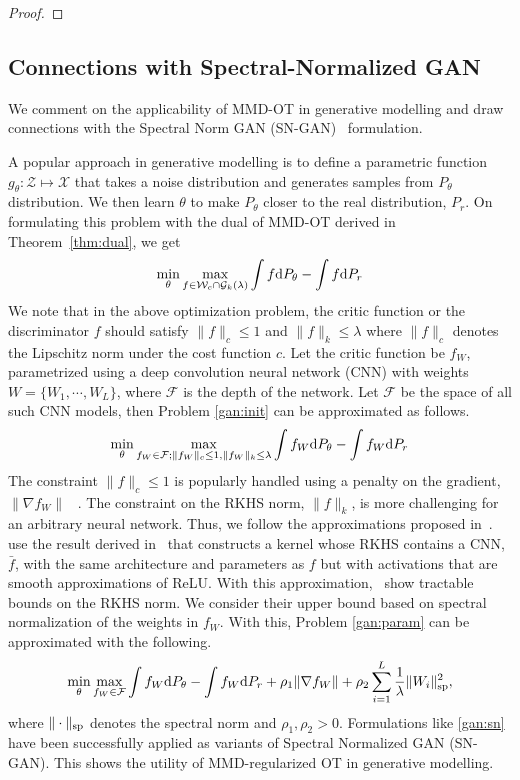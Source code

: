\begin{proof}
\end{proof}
\subsection{Connections with Spectral-Normalized GAN}\label{sgan}
We comment on the applicability of MMD-OT in generative modelling and draw connections with the Spectral Norm GAN (SN-GAN)~\citep{sngan} formulation.

A popular approach in generative modelling is to define a parametric function $g_\theta:\mathcal{Z} \mapsto \mathcal{X}$ that takes a noise distribution and generates samples from $P_\theta$ distribution. We then learn $\theta$ to make $P_\theta$ closer to the real distribution, $P_r$. On formulating this problem with the dual of MMD-OT derived in Theorem~\ref{thm:dual}, we get
\begin{equation}\label{gan:init}
    \min\limits_\theta \max\limits_{f\in \mathcal{W}_c\cap\mathcal{G}_k(\lambda)} \int f \textup{d}P_\theta - \int f \textup{d}P_r
\end{equation}
We note that in the above optimization problem, the critic function or the discriminator $f$ should satisfy $\|f\|_c\leq 1$ and $\|f\|_k\leq \lambda$ where $\|f\|_c$ denotes the Lipschitz norm under the cost function $c$. Let the critic function be $f_W$, parametrized using a deep convolution neural network (CNN) with weights $W=\{W_1, \cdots, W_L\}$, where $\mathcal{F}$ is the depth of the network. Let $\mathcal{F}$ be the space of all such CNN models, then Problem \ref{gan:init} can be approximated as follows.
\begin{equation}\label{gan:param}
    \min\limits_\theta \max\limits_{
    f_W\in \mathcal{F};
    \|f_W\|_c\leq 1, \|f_W\|_k\leq \lambda} \int f_W \textup{d}P_\theta - \int f_W \textup{d}P_r
\end{equation}
The constraint $\|f\|_c\leq 1$ is popularly handled using a penalty on the gradient, $\|\nabla f_W\|$ ~\citep{wgan-gp}. The constraint on the RKHS norm, $\|f\|_k$, is more challenging for an arbitrary neural network. Thus, we follow the approximations proposed in~\cite{Bietti19}.~\cite{Bietti19} use the result derived in~\cite{Bietti2017GroupIS} that constructs a kernel whose RKHS contains a CNN, $\bar{f}$, with the same architecture and parameters as $f$ but with activations that are smooth approximations of ReLU. With this approximation,~\cite{Bietti19} show tractable bounds on the RKHS norm. We consider their upper bound based on spectral normalization of the weights in $f_W$. With this, Problem \ref{gan:param} can be approximated with the following.
\begin{equation}\label{gan:sn}
    \min\limits_\theta \max\limits_{
    f_W\in \mathcal{F}} \int f_W \textup{d}P_\theta - \int f_W \textup{d}P_r + \rho_1\|\nabla f_W\|+ \rho_2\sum_{i=1}^L\frac{1}{\lambda}\|W_i\|_{\textup{sp}}^2,
\end{equation}
where $\|\cdot\|_{\textup{sp}}$ denotes the spectral norm and $\rho_1, \rho_2>0$. Formulations like \ref{gan:sn} have been successfully applied as variants of Spectral Normalized GAN (SN-GAN). This shows the utility of MMD-regularized OT in generative modelling.

